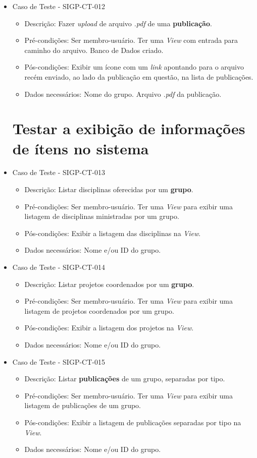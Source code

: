 \documentclass[11pt, a4paper]{book}
\begin{document}
\begin{itemize}
	\item Caso de Teste - SIGP-CT-012
	\begin{itemize}
	\item Descrição: Fazer \emph{upload} de arquivo \emph{.pdf} de uma \textbf{publicação}.
	\item Pré-condições: Ser membro-usuário. Ter uma \emph{View} com entrada para caminho do arquivo. Banco de Dados criado.
	\item Pós-condições: Exibir um ícone com um \emph{link} apontando para o arquivo recém enviado, ao lado da publicação em questão, na lista de publicações.
	\item Dados necessários: Nome do grupo. Arquivo \emph{.pdf} da publicação. 
	\end{itemize}

\newpage
\section{Testar a exibição de informações de ítens no sistema}

	\item Caso de Teste - SIGP-CT-013
	\begin{itemize}
	\item Descrição: Listar disciplinas oferecidas por um \textbf{grupo}.
	\item Pré-condições: Ser membro-usuário. Ter uma \emph{View} para exibir uma listagem de disciplinas ministradas por um grupo.
	\item Pós-condições: Exibir a listagem das disciplinas na \emph{View}.
	\item Dados necessários: Nome  e/ou ID do grupo.
	\end{itemize}
    
	\item Caso de Teste - SIGP-CT-014
	\begin{itemize}
	\item Descrição: Listar projetos coordenados por um \textbf{grupo}.
	\item Pré-condições: Ser membro-usuário. Ter uma \emph{View} para exibir uma listagem de projetos coordenados por um grupo.
	\item Pós-condições: Exibir a listagem dos projetos na \emph{View}.
	\item Dados necessários: Nome  e/ou ID do grupo.
	\end{itemize}

	\item Caso de Teste - SIGP-CT-015
	\begin{itemize}
	\item Descrição: Listar \textbf{publicações} de um grupo, separadas por tipo.
	\item Pré-condições: Ser membro-usuário. Ter uma \emph{View} para exibir uma listagem de publicações de um grupo.
	\item Pós-condições: Exibir a listagem de publicações separadas por tipo na \emph{View}.
	\item Dados necessários: Nome e/ou ID do grupo.
	\end{itemize}


\end{itemize}
\end{document}
